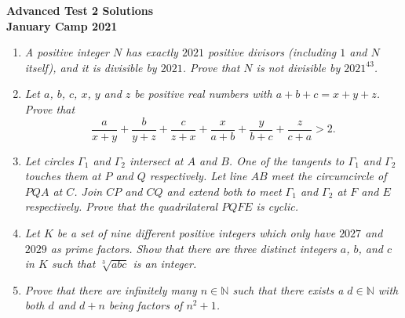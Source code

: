 \documentclass{article}
\begin{document}
\thispagestyle{empty}

\begin{center}
  \textbf{\Large Advanced Test 2 Solutions}
  \\ \vspace{1em}
  \textbf{\large January Camp 2021}
\end{center}

\vspace{24pt}

\begin{enumerate}[1.]

  \item %
  {\itshape A positive integer $N$ has exactly $2021$ positive divisors (including $1$ and $N$ itself), and it is divisible by $2021$.
  Prove that $N$ is not divisible by $2021^{43}$.}
  
  
  \item %
  {\itshape Let $a$, $b$, $c$, $x$, $y$ and $z$ be positive real numbers with $a + b + c = x + y + z$.
  Prove that 
  \[ \frac{a}{x + y} + \frac{b}{y + z} + \frac{c}{z + x} + \frac{x}{a + b} + \frac{y}{b + c} + \frac{z}{c + a} > 2. \]}
  
  
  \item %
  {\itshape Let circles $\Gamma_1$ and $\Gamma_2$ intersect at $A$ and $B$. One of the tangents to $\Gamma_1$ and $\Gamma_2$ touches them at $P$ and $Q$ respectively. Let line $AB$ meet the circumcircle of $PQA$ at $C$. Join $CP$ and $CQ$ and extend both to meet $\Gamma_1$ and $\Gamma_2$ at $F$ and $E$ respectively. Prove that the quadrilateral $PQFE$ is cyclic.}
  
  
  \item %
  {\itshape Let $K$ be a set of nine different positive integers which only have $2027$ and $2029$ as prime factors.
  Show that there are three distinct integers $a$, $b$, and $c$ in $K$ such that $\sqrt[3]{abc}$ is an integer.}
  
  
  \item %
  {\itshape Prove that there are infinitely many $n \in \mathbb{N}$ such that there exists a $d \in \mathbb{N}$ with both $d$ and $d + n$ being factors of $n^2 + 1$.}
  

\end{enumerate}
\end{document}
